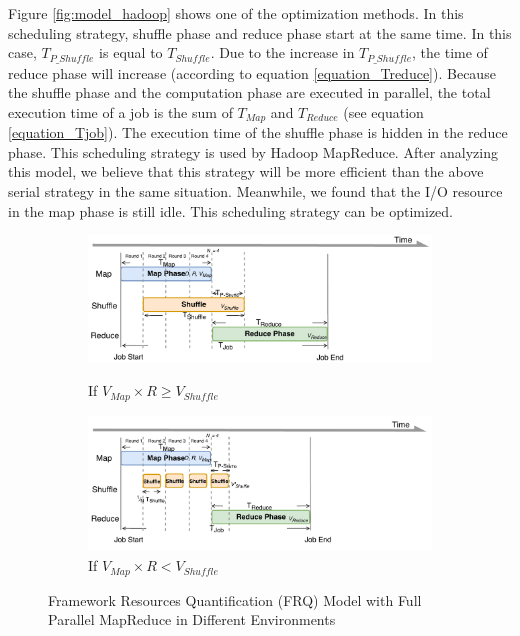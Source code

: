 {Figure \ref{fig:model_hadoop} shows one of the optimization methods. In this scheduling strategy, shuffle phase and reduce phase start at the same time. In this case, \(T_{P\_Shuffle}\) is equal to \(T_{Shuffle}\). Due to the increase in \(T_{P\_Shuffle}\), the time of reduce phase will increase (according to equation \ref{equation_Treduce}). Because the shuffle phase and the computation phase are executed in parallel, the total execution time of a job is the sum of \(T_{Map}\) and \(T_{Reduce}\) (see equation \ref{equation_Tjob}). The execution time of the shuffle phase is hidden in the reduce phase. This scheduling strategy is used by Hadoop MapReduce. After analyzing this model, we believe that this strategy will be more efficient than the above serial strategy in the same situation. Meanwhile, we found that the I/O resource in the map phase is still idle. This scheduling strategy can be optimized.

\begin{figure}
	\centering
	\begin{minipage}[hb]{\linewidth}
		\begin{subfigure}{\linewidth}
			\begin{minipage}{\linewidth}
				\includegraphics[width=\linewidth]{fig/model_scache1}
				\caption{\color{blue}If \(V_{Map} \times R \ge V_{Shuffle}\)}
				\label{fig:model_scache1}
			\end{minipage}
			\begin{minipage}{\linewidth}
				\includegraphics[width=\linewidth]{fig/model_scache2}
				\caption{\color{blue}If \(V_{Map} \times R < V_{Shuffle}\)}
				\label{fig:model_scache2}
			\end{minipage}
		\end{subfigure}
		\caption{\color{blue}Framework Resources Quantification (FRQ) Model with Full Parallel MapReduce in Different Environments}
		\label{fig:model_scache}
	\end{minipage}
\end{figure}

}
